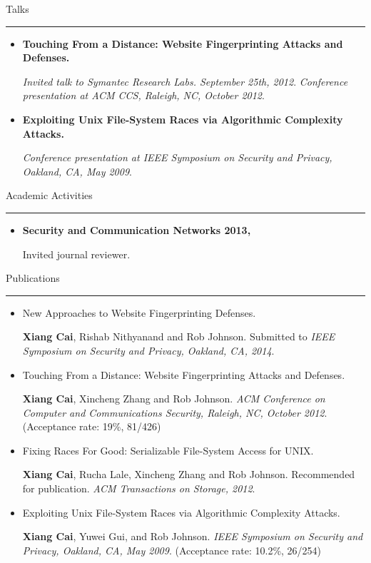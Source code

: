 \documentclass[11pt,oneside]{article}
\newenvironment{ressection}[1]{
	\vspace{-1pt}
	{\fontfamily{phv}\selectfont\Large#1}
	
	\vspace{-8pt} \rule{\textwidth}{.5pt}
	
	\vspace{-8pt}
	\begin{itemize}
	\vspace{.5pt}
}{
	\end{itemize}
}
\newcommand{\resitem}[1]{
	\vspace{1pt}
	\item \begin{flushleft} #1 \end{flushleft}
}
\begin{document}
\begin{ressection}{Talks}
	\resitem{\textbf{Touching From a Distance: Website Fingerprinting
		Attacks and Defenses.} \begin{small}
		
		\textit{Invited talk to Symantec Research Labs. September 25th, 2012}. \textit{Conference presentation at ACM CCS, Raleigh, NC, October 2012}.
		\end{small}}

	\resitem{\textbf{Exploiting Unix File-System Races via Algorithmic
		Complexity Attacks.} \begin{small}
		
		\textit{Conference presentation at IEEE Symposium on Security and Privacy, Oakland, CA, May 2009}.
		\end{small}}
\end{ressection}

\begin{ressection}{Academic Activities}
	\resitem{\textbf{Security and Communication Networks 2013, } \begin{small}Invited journal reviewer.\end{small}
	}
\end{ressection}


\begin{ressection}{Publications}
	\resitem{New Approaches to Website Fingerprinting Defenses. \begin{small} \textbf{Xiang Cai}, Rishab Nithyanand
			and Rob Johnson. Submitted to \textit{IEEE Symposium on Security and Privacy,
				Oakland, CA, 2014}.
	\end{small}}

	\resitem{Touching From a Distance: Website Fingerprinting
		Attacks and Defenses. \begin{small} \textbf{Xiang Cai}, Xincheng Zhang
			and Rob Johnson. \textit{ACM Conference on Computer and Communications Security, Raleigh, NC, October 2012}. (Acceptance rate: 19\%, 81/426)\end{small}}

	\resitem{Fixing Races For Good: Serializable File-System
		Access for UNIX. \begin{small} \textbf{Xiang Cai}, Rucha Lale,
		Xincheng Zhang and Rob Johnson. Recommended for publication. \textit{ACM Transactions on Storage, 2012}.\end{small}}

	\resitem{Exploiting Unix File-System Races via Algorithmic
		Complexity Attacks. \begin{small} \textbf{Xiang Cai}, Yuwei Gui, and
			Rob Johnson. \textit{IEEE Symposium on Security and Privacy,
				Oakland, CA, May 2009}. (Acceptance rate: 10.2\%, 26/254)\end{small}}

\end{ressection}
\end{document}
